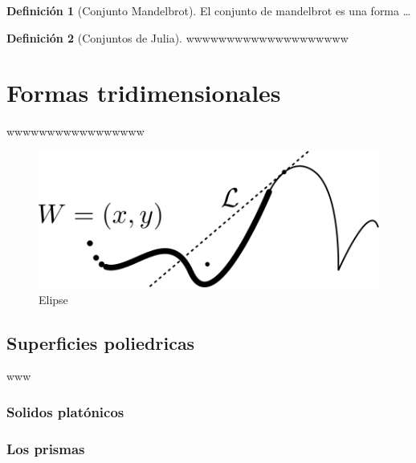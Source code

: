 \documentclass[16pt,]{krantz}
\theoremstyle{definition}
\newtheorem{definition}{Definición}[chapter]
\theoremstyle{definition}
\theoremstyle{definition}
\theoremstyle{definition}
\theoremstyle{remark}
\begin{document}
\begin{definition}[Conjunto Mandelbrot]
\protect\hypertarget{def:mmandelbrot}{}{\label{def:mmandelbrot} {} }El conjunto de mandelbrot es una forma \ldots{}
\end{definition}

\begin{definition}[Conjuntos de Julia]
\protect\hypertarget{def:julia}{}{\label{def:julia} {} }wwwwwwwwwwwwwwwwwwww
\end{definition}

\hypertarget{formas-tridimensionales}{%
\chapter{Formas tridimensionales}\label{formas-tridimensionales}}

wwwwwwwwwwwwwwwww

\begin{figure}[!ht]

{\centering \includegraphics{puntolinea} 

}

\caption{Elipse}\label{fig:pressure1}
\end{figure}

\hypertarget{superficies-poliedricas}{%
\section{Superficies poliedricas}\label{superficies-poliedricas}}

www

\hypertarget{solidos-platuxf3nicos}{%
\subsection{Solidos platónicos}\label{solidos-platuxf3nicos}}

\hypertarget{los-prismas}{%
\subsection{Los prismas}\label{los-prismas}}
\end{document}
